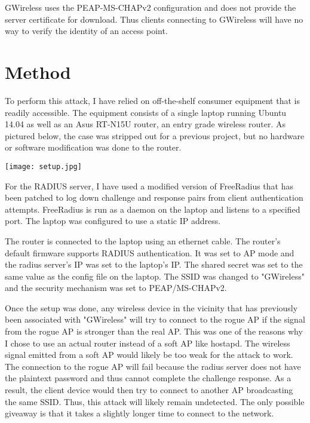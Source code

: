 \documentclass[twoside]{article}
\begin{document}
\begin{multicols}{2}
GWireless uses the PEAP-MS-CHAPv2 configuration and does not provide the server certificate for download\cite{3}. Thus clients connecting to GWireless will have no way to verify the identity of an access point.



\section{Method}

To perform this attack, I have relied on off-the-shelf consumer equipment that is readily accessible. The equipment consists of a single laptop running Ubuntu 14.04 as well as an Asus RT-N15U router, an entry grade wireless router. As pictured below, the case was stripped out for a previous project, but no hardware or software modification was done to the router.

\texttt{[image: setup.jpg]}

For the RADIUS server, I have used a modified version of FreeRadius\cite{4} that has been patched to log down challenge and response pairs from client authentication attempts. FreeRadius is run as a daemon on the laptop and listens to a specified port. The laptop was configured to use a static IP address.

The router is connected to the laptop using an ethernet cable. The router's default firmware supports RADIUS authentication. It was set to AP mode and the radius server's IP was set to the laptop's IP. The shared secret was set to the same value as the config file on the laptop. The SSID was changed to "GWireless" and the security mechanism was set to PEAP/MS-CHAPv2.

Once the setup was done, any wireless device in the vicinity that has previously been associated with "GWireless" will try to connect to the rogue AP if the signal from the rogue AP is stronger than the real AP. This was one of the reasons why I chose to use an actual router instead of a soft AP like hostapd. The wireless signal emitted from a soft AP would likely be too weak for the attack to work. The connection to the rogue AP will fail because the radius server does not have the plaintext password and thus cannot complete the challenge response. As a result, the client device would then try to connect to another AP broadcasting the same SSID. Thus, this attack will likely remain undetected. The only possible giveaway is that it takes a slightly longer time to connect to the network. 




\end{multicols}
\end{document}
